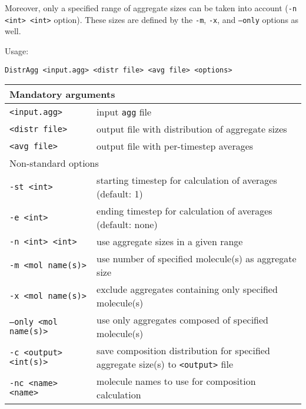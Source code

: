 Moreover, only a specified range of aggregate sizes can be taken into
account (\texttt{-n <int> <int>} option). These sizes are defined by the
\texttt{-m}, \texttt{-x}, and \texttt{--only} options as well.

Usage:

\vspace{1em}
\noindent
\texttt{DistrAgg <input.agg> <distr file> <avg file> <options>}

\noindent
\begin{longtable}{p{}p{}}
  \toprule
  \multicolumn{2}{l}{Mandatory arguments} \\
  \midrule
  \texttt{<input.agg>} & input \texttt{agg} file \\
  \texttt{<distr file>} & output file with distribution of aggregate
    sizes \\
  \texttt{<avg file>} & output file with per-timestep averages \\
  \toprule
  \multicolumn{2}{l}{Non-standard options} \\
  \midrule
  \texttt{-st <int>} & starting timestep for calculation of averages (default: 1) \\
  \texttt{-e <int>} & ending timestep for calculation of averages (default: none) \\
  \texttt{-n <int> <int>} & use aggregate sizes in a given range \\
  \texttt{-m <mol name(s)>} & use number of specified molecule(s) as
    aggregate size \\
  \texttt{-x <mol name(s)>} & exclude aggregates containing only specified
    mole\-cule(s) \\
  \texttt{--only <mol name(s)>} & use only aggregates composed of specified
    molecule(s) \\
  \texttt{-c <output> <int(s)>} & save composition distribution for
    specified aggregate size(s) to \texttt{<output>} file \\
  \texttt{-nc <name> <name>} & molecule names to use for composition
    calculation \\
  \bottomrule
\end{longtable}

